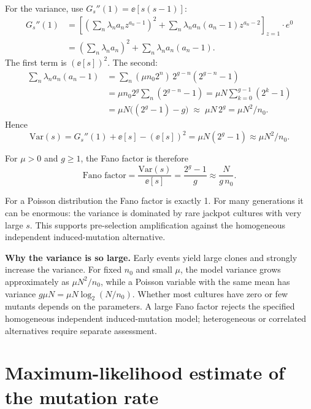 For the variance, use $G_s''(1)=\ee[s(s-1)]$:
\begin{align}
G_s''(1)
&= \left[\left(\sum_n\lambda_n a_n z^{a_n-1}\right)^{2}
+ \sum_n\lambda_n a_n(a_n-1)z^{a_n-2}\right]_{z=1}
\cdot e^{0} \\
&= \left(\sum_n\lambda_n a_n\right)^{2}
+ \sum_n\lambda_n a_n(a_n-1).
\end{align}
The first term is $(\ee[s])^2$. The second:
\begin{align}
\sum_n\lambda_n a_n(a_n-1)
&= \sum_n (\mu n_0 2^{n})\,2^{g-n}(2^{g-n}-1) \\
&= \mu n_0 2^{g}\sum_n(2^{g-n}-1)
= \mu N \sum_{k=0}^{g-1}(2^{k}-1) \\
&= \mu N \bigl((2^{g}-1) - g\bigr)
\;\approx\; \mu N\,2^{g}
= \mu N^{2}/n_0 .
\end{align}
Hence
\begin{equation}\label{eq:lecture03-s-var}
\mathrm{Var}(s) = G_s''(1) + \ee[s] - (\ee[s])^{2}
=\mu N(2^g-1)\approx\mu N^{2}/n_0.
\end{equation}

For $\mu>0$ and $g\geq1$, the Fano factor is therefore
\begin{equation}\label{eq:lecture03-pano}
\text{Fano factor} = \frac{\mathrm{Var}(s)}{\ee[s]}
=\frac{2^g-1}{g}\approx\frac{N}{g\,n_0}.
\end{equation}

For a Poisson distribution the Fano factor is exactly 1. For many generations it can be enormous: the variance is dominated by rare jackpot cultures with very large $s$. This supports pre-selection amplification against the homogeneous independent induced-mutation alternative.

\begin{remark}\label{rem:lecture03-variance-large}
\textbf{Why the variance is so large.}
Early events yield large clones and strongly increase the variance. For fixed $n_0$ and small $\mu$, the model variance grows approximately as $\mu N^2/n_0$, while a Poisson variable with the same mean has variance $g\mu N=\mu N\log_2(N/n_0)$. Whether most cultures have zero or few mutants depends on the parameters. A large Fano factor rejects the specified homogeneous independent induced-mutation model; heterogeneous or correlated alternatives require separate assessment.
\end{remark}

\section{Maximum-likelihood estimate of the mutation rate}\label{sec:lecture03-mle}

